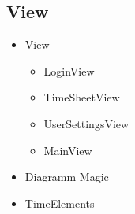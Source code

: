     \subsection{View}
        \begin{itemize}
            \item{View}
                \begin{itemize}
                    \item{LoginView}
                    \item{TimeSheetView}
                    \item{UserSettingsView}
                    \item{MainView}
                \end{itemize}
            \item{Diagramm Magic}
            \item{TimeElements}
        \end{itemize}
